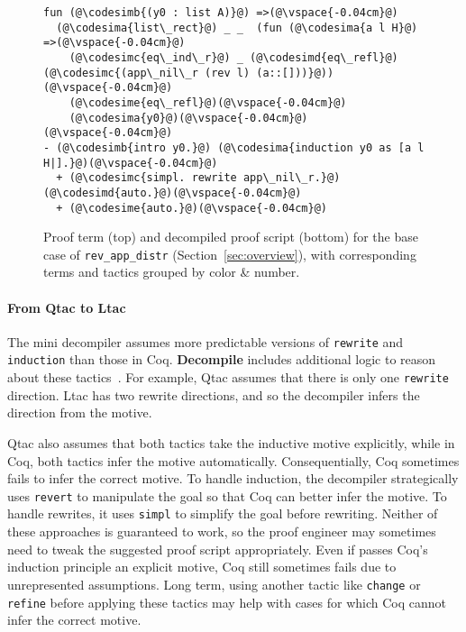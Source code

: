 \begin{figure}
\begin{lstlisting}
fun (@\codesimb{(y0 : list A)}@) =>(@\vspace{-0.04cm}@)
  (@\codesima{list\_rect}@) _ _  (fun (@\codesima{a l H}@) =>(@\vspace{-0.04cm}@)
    (@\codesimc{eq\_ind\_r}@) _ (@\codesimd{eq\_refl}@) (@\codesimc{(app\_nil\_r (rev l) (a::[]))}@))(@\vspace{-0.04cm}@)
    (@\codesime{eq\_refl}@)(@\vspace{-0.04cm}@)
    (@\codesima{y0}@)(@\vspace{-0.04cm}@)
(@\vspace{-0.04cm}@)
- (@\codesimb{intro y0.}@) (@\codesima{induction y0 as [a l H|].}@)(@\vspace{-0.04cm}@)
  + (@\codesimc{simpl. rewrite app\_nil\_r.}@) (@\codesimd{auto.}@)(@\vspace{-0.04cm}@)
  + (@\codesime{auto.}@)(@\vspace{-0.04cm}@)
\end{lstlisting}
\vspace{-0.3cm}
\caption{Proof term (top) and decompiled proof script (bottom) for the base case of 
\lstinline{rev_app_distr} (Section~\ref{sec:overview}), with corresponding terms and tactics 
grouped by color \& number.}
\label{fig:rainbow}
\end{figure}

\paragraph{From Qtac to Ltac}
The mini decompiler assumes more predictable versions of \lstinline{rewrite} and \lstinline{induction}
than those in Coq. \textbf{Decompile} includes additional logic to reason about these tactics~\href{https://github.com/uwplse/coq-plugin-lib/blob/9ef05815c261de9c99b604c6b581ba1c4fbc1a46/src/coq/decompiler/decompiler.ml}{}. %
For example, Qtac assumes that there is only one \lstinline{rewrite} direction. Ltac has two rewrite directions,
and so the decompiler infers the direction from the motive.

Qtac also assumes that both tactics take the inductive motive explicitly,
while in Coq, both tactics infer the motive automatically.
Consequentially, Coq sometimes fails to infer the correct motive.
To handle induction, the decompiler strategically uses \lstinline{revert} to manipulate the goal
so that Coq can better infer the motive.
To handle rewrites, it uses \lstinline{simpl} to simplify the goal before rewriting.
Neither of these approaches is guaranteed to work, so the proof engineer may sometimes need to tweak the 
suggested proof script appropriately.
Even if  passes Coq's induction principle an explicit motive, Coq still sometimes fails due
to unrepresented assumptions.
Long term, using another tactic like \lstinline{change} or \lstinline{refine} before applying these tactics
may help with cases for which Coq cannot infer the correct motive.

